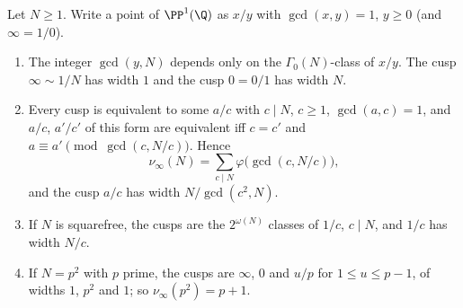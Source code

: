 \begin{proposition}\label{prop:modforms:cusps-gamma0}
Let $N\ge1$. Write a point of $\PP^1(\Q)$ as $x/y$ with $\gcd(x,y)=1$, $y\ge0$ (and $\infty=1/0$).
\begin{enumerate}[label=(\roman*)]
\item The integer $\gcd(y,N)$ depends only on the $\Gamma_0(N)$-class of $x/y$. The cusp $\infty\sim1/N$ has width $1$ and the cusp $0=0/1$ has width $N$.
\item Every cusp is equivalent to some $a/c$ with $c\mid N$, $c\ge1$, $\gcd(a,c)=1$, and $a/c$, $a'/c'$ of this form are equivalent iff $c=c'$ and
$a\equiv a'\pmod{\gcd(c,N/c)}$. Hence
\[
\nu_\infty(N)=\sum_{c\mid N}\varphi\bigl(\gcd(c,N/c)\bigr),
\]
and the cusp $a/c$ has width $N/\gcd(c^2,N)$.
\item If $N$ is squarefree, the cusps are the $2^{\omega(N)}$ classes of $1/c$, $c\mid N$, and $1/c$ has width $N/c$.
\item If $N=p^2$ with $p$ prime, the cusps are $\infty$, $0$ and $u/p$ for $1\le u\le p-1$, of widths $1$, $p^2$ and $1$; so $\nu_\infty(p^2)=p+1$.
\end{enumerate}
\end{proposition}

